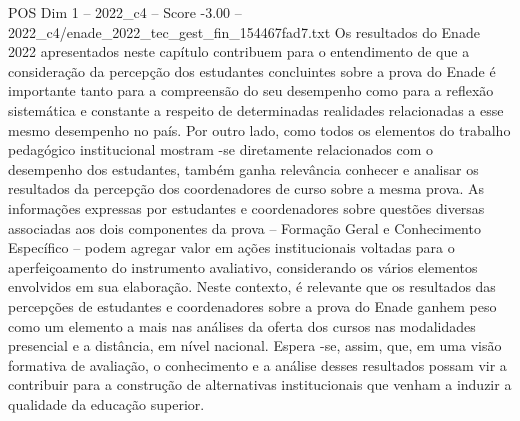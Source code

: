 \begin{textsample}{POS Dim 1 – 2022\_c4 – Score -3.00 – 2022\_c4/enade\_2022\_tec\_gest\_fin\_154467fad7.txt}
Os resultados do Enade 2022 apresentados neste capítulo contribuem para o entendimento de que a consideração da percepção dos estudantes concluintes sobre a prova do Enade é importante tanto para a compreensão do seu desempenho como para a reflexão sistemática e constante a respeito de determinadas realidades relacionadas a esse mesmo desempenho no país.
Por outro lado, como todos os elementos do trabalho pedagógico institucional mostram -se diretamente relacionados com o desempenho dos estudantes, também ganha relevância conhecer e analisar os resultados da percepção dos coordenadores de curso sobre a mesma prova.
As informações expressas por estudantes e coordenadores sobre questões diversas associadas aos dois componentes da prova – Formação Geral e Conhecimento Específico – podem agregar valor em ações institucionais voltadas para o aperfeiçoamento do instrumento avaliativo, considerando os vários elementos envolvidos em sua elaboração.
Neste contexto, é relevante que os resultados das percepções de estudantes e coordenadores sobre a prova do Enade ganhem peso como um elemento a mais nas análises da oferta dos cursos nas modalidades presencial e a distância, em nível nacional.
Espera -se, assim, que, em uma visão formativa de avaliação, o conhecimento e a análise desses resultados possam vir a contribuir para a construção de alternativas institucionais que venham a induzir a qualidade da educação superior.

\end{textsample}
